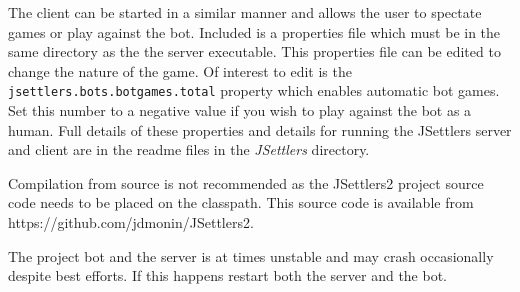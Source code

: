\documentclass[]{article}
\def\code#1{\texttt{#1}}
\begin{document}
\par The client can be started in a similar manner and allows the user to spectate games or play against the bot. Included is a properties file which must be in the same directory as the the server executable. This properties file can be edited to change the nature of the game. Of interest to edit is the \code{jsettlers.bots.botgames.total} property which enables automatic bot games. Set this number to a negative value if you wish to play against the bot as a human. Full details of these properties and details for running the JSettlers server and client are in the readme files in the \textit{JSettlers} directory.

\par Compilation from source is not recommended as the JSettlers2 project source code needs to be placed on the classpath. This source code is available from https://github.com/jdmonin/JSettlers2.

\par The project bot and the server is at times unstable and may crash occasionally despite best efforts. If this happens restart both the server and the bot.
\printbibliography
\end{document}
